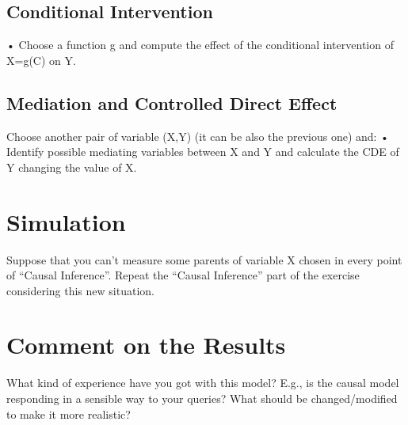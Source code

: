 \documentclass[a4paper,12pt]{article} %
\begin{document}
\subsection*{Conditional Intervention}
• Choose a function g and compute the effect of the conditional intervention of X=g(C) on Y.

\subsection*{Mediation and Controlled Direct Effect}
Choose another pair of variable (X,Y) (it can be also the previous one) and:
• Identify possible mediating variables between X and Y and calculate the CDE of Y changing the value of X.

\section{Simulation}
Suppose that you can’t measure some parents of variable X chosen in every point of “Causal Inference”.
Repeat the “Causal Inference” part of the exercise considering this new situation.

\section{Comment on the Results}
What kind of experience have you got with this model? E.g., is the causal model responding in a sensible way to your queries? What should be changed/modified to make it more realistic?
\end{document}
